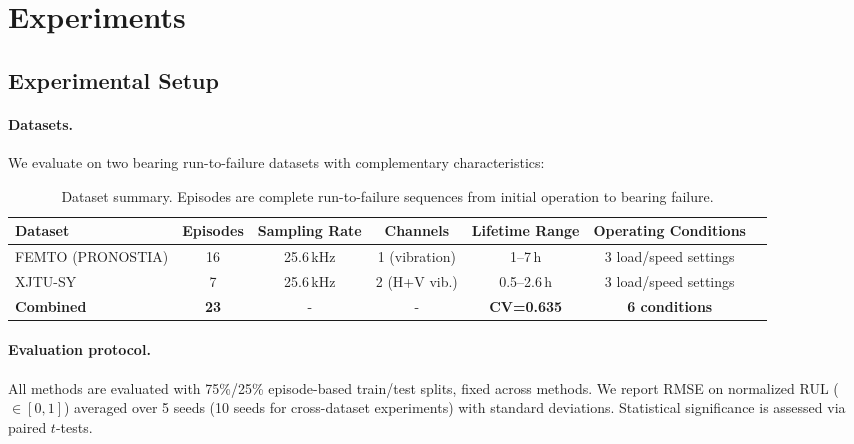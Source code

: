 \section{Experiments}
\label{sec:experiments}

\subsection{Experimental Setup}
\label{sec:setup}

\paragraph{Datasets.} We evaluate on two bearing run-to-failure datasets with complementary characteristics:

\begin{table}[t]
\centering
\caption{Dataset summary. Episodes are complete run-to-failure sequences from initial operation to bearing failure.}
\label{tab:datasets}
\small
\begin{tabular}{@{}lcccccc@{}}
\toprule
Dataset & Episodes & Sampling Rate & Channels & Lifetime Range & Operating Conditions \\
\midrule
FEMTO (PRONOSTIA) & 16 & 25.6\,kHz & 1 (vibration) & 1--7\,h & 3 load/speed settings \\
XJTU-SY & 7 & 25.6\,kHz & 2 (H+V vib.) & 0.5--2.6\,h & 3 load/speed settings \\
\midrule
\textbf{Combined} & \textbf{23} &  -  &  -  & \textbf{CV=0.635} & \textbf{6 conditions} \\
\bottomrule
\end{tabular}
\end{table}

\paragraph{Evaluation protocol.} All methods are evaluated with 75\%/25\% episode-based train/test splits, fixed across methods. We report RMSE on normalized RUL ($\in [0, 1]$) averaged over 5 seeds (10 seeds for cross-dataset experiments) with standard deviations. Statistical significance is assessed via paired $t$-tests.

